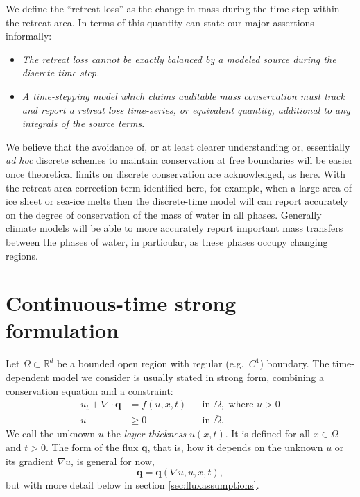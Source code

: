 \documentclass[final,leqno,onefignum,onetabnum]{siamltex1213bueler}
\newcommand\bq{\mathbf{q}}
\newcommand{\Div}{\nabla\cdot}
\renewcommand{\grad}{\nabla}
\newcommand\RR{\mathbb{R}}
\begin{document}
We define the ``retreat loss'' as the change in mass during the time step within the retreat area.  In terms of this quantity can state our major assertions informally:\begin{itemize}
\item  \emph{The retreat loss cannot be \emph{exactly} balanced by a \emph{modeled} source during the discrete time-step.}
\item  \emph{A time-stepping model which claims auditable mass conservation must track and report a retreat loss time-series, or equivalent quantity, additional to any integrals of the source terms.}
\end{itemize}

We believe that the avoidance of, or at least clearer understanding or, essentially \emph{ad hoc} discrete schemes to maintain conservation at free boundaries will be easier once theoretical limits on discrete conservation are acknowledged, as here.  With the retreat area correction term identified here, for example, when a large area of ice sheet or sea-ice melts then the discrete-time model will can report accurately on the degree of conservation of the mass of water in all phases.  Generally climate models will be able to more accurately report important mass transfers between the phases of water, in particular, as these phases occupy changing regions.


\section{Continuous-time strong formulation}  \label{sec:strongform}

Let $\Omega \subset \RR^d$ be a bounded open region with regular (e.g.~$C^1$) boundary.  The time-dependent model we consider is usually stated in strong form, combining a conservation equation and a constraint:
\begin{align}
u_t + \Div \bq &= f(u,x,t) &&\text{in } \Omega, \text{ where } u > 0 \label{eq:massconserve} \\
u &\ge 0 &&\text{in } \bar\Omega. \label{eq:constraint}
\end{align}
We call the unknown $u$ the \emph{layer thickness} $u(x,t)$.  It is defined for all $x\in \Omega$ and $t>0$.  The form of the flux $\bq$, that is, how it depends on the unknown $u$ or its gradient $\grad u$, is general for now,
\begin{equation}
\bq = \bq(\grad u,u,x,t), \label{eq:fluxdepends}
\end{equation}
but with more detail below in section \ref{sec:fluxassumptions}.
\end{document}

